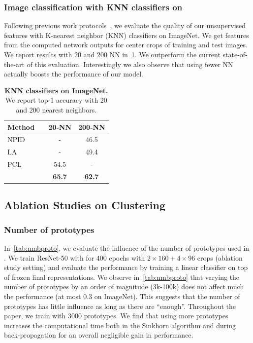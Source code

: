 \subsubsection{Image classification with KNN classifiers on \ImNet}
Following previous work protocols~\cite{wu2018unsupervised,zhuang2019local}, we evaluate the quality of our unsupervised features with K-nearest neighbor (KNN) classifiers on ImageNet.
We get features from the computed network outputs for center crops of training and test images.
We report results with $20$ and $200$ NN in~\cref{tab:knn}.
We outperform the current state-of-the-art of this evaluation.
Interestingly we also observe that using fewer NN actually boosts the performance of our model.
\begin{table}[h]
  \caption{
\textbf{KNN classifiers on ImageNet.} We report top-1 accuracy with $20$ and $200$ nearest neighbors.
}
\vspace{.3em}
  \label{tab:knn}
\centering
\begin{tabular}{ll c c}
    \toprule
	  Method && 20-NN & 200-NN \\
    \midrule
	NPID~\cite{wu2018unsupervised} && - & 46.5 \\
	LA~\cite{zhuang2019local} && - & 49.4 \\
	PCL~\cite{li2020prototypical} && 54.5 & - \\
    \midrule
	\OURS && \bf 65.7 & \bf 62.7 \\
    \bottomrule
  \end{tabular}
\end{table}

\subsection{Ablation Studies on Clustering}
\label{ap:ablation}

\subsubsection{Number of prototypes}
In~\cref{tab:nmbproto}, we evaluate the influence of the number of prototypes used in \OURS.
We train ResNet-50 with \OURS for $400$ epochs with $2 \times 160 + 4 \times 96$ crops (ablation study setting) and evaluate the performance by training a linear classifier on top of frozen final representations.
We observe in~\cref{tab:nmbproto} that varying the number of prototypes by an order of magnitude (3k-100k) does not affect much the performance (at most $0.3$ on ImageNet).
This suggests that the number of prototypes has little influence as long as there are ``enough''.
Throughout the paper, we train \OURS with $3000$ prototypes.
We find that using more prototypes increases the computational time both in the Sinkhorn algorithm and during back-propagation for an overall negligible gain in performance.

